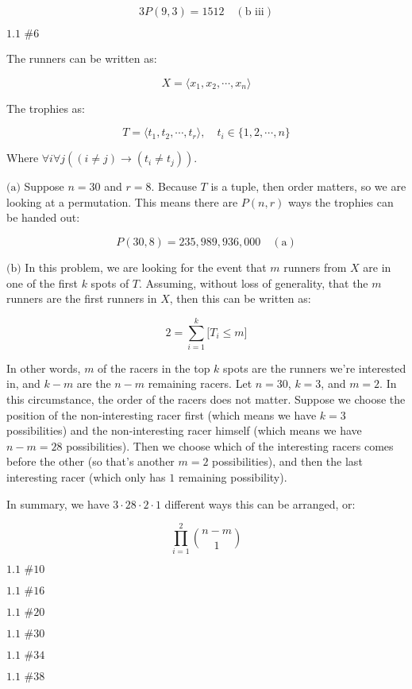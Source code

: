 \documentclass{article}
\newcommand{\problem}[2]{$\boxed{\text{#1 \##2}}$}
\newcommand{\subproblem}[1]{$\boxed{\text{(#1)}}$}
\newcommand{\subsolution}[2]{\boxed{#2\quad(\text{#1})}}
\begin{document}
\begin{multicols*}{2}
\[
\subsolution{b iii}{3P(9,3)=1512}
\]

%
\problem{1.1}{6}

The runners can be written as:

\[
X=\langle x_1,x_2,\cdots,x_n\rangle
\]

The trophies as:

\[
T=\langle t_1,t_2,\cdots,t_r\rangle,\quad t_i\in\{1,2,\cdots,n\}
\]

Where $\forall{}i\forall{}j((i\ne{}j)\rightarrow(t_i\ne{}t_j))$.

%
\subproblem{a} Suppose $n=30$ and $r=8$. Because $T$ is a tuple, then
order matters, so we are looking at a permutation. This means there
are $P(n,r)$ ways the trophies can be handed out:

\[
\subsolution{a}{P(30,8)=235,989,936,000}
\]

%
\subproblem{b} In this problem, we are looking for the event that $m$
runners from $X$ are in one of the first $k$ spots of $T$. Assuming,
without loss of generality, that the $m$ runners are the first runners
in $X$, then this can be written as:

\[
2=\sum\limits_{i=1}^k \lbrack T_i\le m\rbrack
\]

In other words, $m$ of the racers in the top $k$ spots are the runners
we're interested in, and $k-m$ are the $n-m$ remaining racers. Let
$n=30$, $k=3$, and $m=2$. In this circumstance, the order of the
racers does not matter. Suppose we choose the position of the
non-interesting racer first (which means we have $k=3$ possibilities)
and the non-interesting racer himself (which means we have $n-m=28$
possibilities). Then we choose which of the interesting racers comes
before the other (so that's another $m=2$ possibilities), and then the
last interesting racer (which only has $1$ remaining possibility).

In summary, we have $3\cdot28\cdot2\cdot1$ different ways this can be
arranged, or:

\[
\prod\limits_{i=1}^2\binom{n-m}{1}
\]

%
\problem{1.1}{10}



%
\problem{1.1}{16}



%
\problem{1.1}{20}



%
\problem{1.1}{30}



%
\problem{1.1}{34}



%
\problem{1.1}{38}




\end{multicols*}
\end{document}
